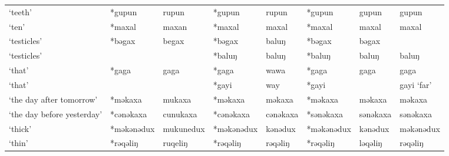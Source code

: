 \begin{landscape}
\begin{longtable}[c]{@{}p{3cm}<{\raggedright}p{2.75cm}<{\raggedright}p{2.75cm}<{\raggedright}p{2.75cm}<{\raggedright}p{2.75cm}<{\raggedright}p{2.75cm}<{\raggedright}p{2.75cm}<{\raggedright}p{2.75cm}<{\raggedright}@{}}
`teeth'                                              & *gupun             & rupun                          & *gupun             & rupun                      & *gupun           & gupun                    & gupun                             \\
`ten'                                                & *maxal             & maxan                          & *maxal             & maxal                      & *maxal           & maxal                    & maxal                             \\
`testicles'                                          & *bəgax             & begax                          & *bəgax             & baluŋ                      & *bəgax           & bəgax                    &                                   \\
`testicles'                                          &                    &                                & *baluŋ             & baluŋ                      & *baluŋ           & baluŋ                    & baluŋ                             \\
`that'                                               & *gaga              & gaga                           & *gaga              & wawa                       & *gaga            & gaga                     & gaga                              \\
`that'                                               &                    &                                & *gayi              & way                        & *gayi            &                          & gayi `far'                        \\
`the day after tomorrow'                             & *məkaxa            & mukaxa                         & *məkaxa            & məkaxa                     & *məkaxa          & məkaxa                   & məkaxa                            \\
`the day before yesterday'                           & *cənəkaxa          & cunukaxa                       & *cənəkaxa          & cənəkaxa                   & *sənəkaxa        & sənəkaxa                 & sənəkaxa                          \\
`thick'                                              & *məkənədux         & mukunedux                      & *məkənədux         & kənədux                    & *məkənədux       & kənədux                  & məkənədux                         \\
`thin'                                               & *rəqəliŋ           & ruqeliŋ                        & *rəqəliŋ           & rəqəliŋ                    & *rəqəliŋ         & ləqəliŋ                  & rəqəliŋ                           \\

\end{longtable}
\end{landscape}
